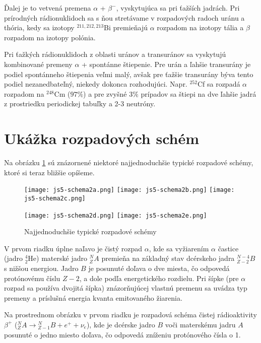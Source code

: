\documentclass[../../main.tex]{subfiles}
\begin{document}
Ďalej je to vetvená premena $\alpha$ + $\beta^-$, vyskytujúca sa pri ťažších jadrách. Pri prírodných rádionuklidoch sa s ňou stretávame v rozpadových radoch uránu a thória, kedy sa izotopy $^{211,212,213}$Bi premieňajú $\alpha$ rozpadom na izotopy tália a $\beta$ rozpadom na izotopy polónia. 

Pri ťažkých rádionuklidoch z oblasti uránov a transuránov sa vyskytujú kombinované premeny $\alpha$ + spontánne štiepenie. Pre urán a ľahšie transurány je podiel spontánneho štiepenia veľmi malý, avšak pre ťažšie transurány býva tento podiel nezanedbateľný, niekedy dokonca rozhodujúci. Napr. $^{252}$Cf sa rozpadá $\alpha$ rozpadom na $^{248}$Cm ($97\%$) a pre zvyšné $3\%$ prípadov sa štiepi na dve ľahšie jadrá z prostriedku periodickej tabuľky a 2-3 neutróny.

\section{Ukážka rozpadových schém}

Na obrázku \ref{js5:img:schema2} sú znázornené niektoré najjednoduchšie typické rozpadové schémy, ktoré si teraz bližšie opíšeme.

\begin{figure}[h!]
\centering
\texttt{[image: js5-schema2a.png]}
\texttt{[image: js5-schema2b.png]}
\texttt{[image: js5-schema2c.png]}
\vspace*{1cm}

\texttt{[image: js5-schema2d.png]}
\texttt{[image: js5-schema2e.png]}
\caption{Najjednoduchšie typické rozpadové schémy}
\label{js5:img:schema2}
\end{figure}

V prvom riadku úplne naľavo je čistý rozpad $\alpha$, kde sa vyžiarením $\alpha$ častice (jadro $^4_2$He) materské jadro $^N_ZA$ premieňa na základný stav dcérskeho jadra $^{N-4}_{Z-2}B$ s nižšou energiou. Jadro $B$ je posunuté doľava o dve miesta, čo odpovedá protónovému číslu $Z-2$, a dole podľa energetického rozdielu. Pri šípke (pre $\alpha$ rozpad sa používa dvojitá šípka) znázorňujúcej vlastnú premenu sa uvádza typ premeny a príslušná energia kvanta emitovaného žiarenia.

Na prostrednom obrázku v prvom riadku je rozpadová schéma čistej rádioaktivity $\beta^+$ ($^N_ZA\rightarrow {^N_{Z-1}B} + e^+ + {\nu}_e$), kde je dcérske jadro $B$ voči materskému jadru $A$ posunuté o jedno miesto doľava, čo odpovedá zníženiu protónového čísla o 1.
\end{document}
